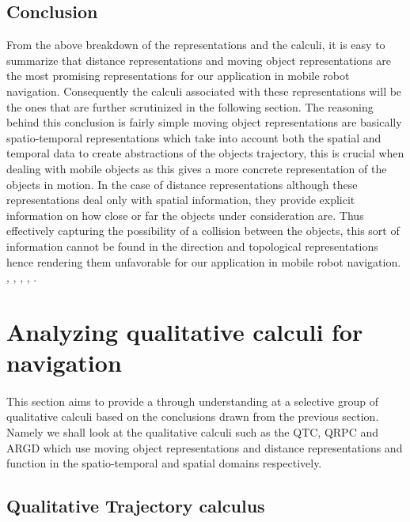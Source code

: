 		\subsection{Conclusion}From the above breakdown of the representations and the calculi, it is easy to summarize that distance representations and moving object representations are the most promising representations for our application in mobile robot navigation. Consequently the calculi associated with these representations will be the ones that are further scrutinized in the following section. The reasoning behind this conclusion is fairly simple moving object representations are basically spatio-temporal representations which take into account both the spatial and temporal data to create abstractions of the objects trajectory, this is crucial when dealing with mobile objects as this gives a more concrete representation of the objects in motion. In the case of distance representations although these representations deal only with spatial information, they provide explicit information on how close or far the objects under consideration are. Thus effectively capturing the possibility of a collision between the objects, this sort of information cannot be found in the direction and topological representations hence rendering them unfavorable for our application in mobile robot navigation. \cite{chen2015survey}, \cite{cohn1997qualitative}, \cite{cohn2001qualitative}, \cite{cohn2008qualitative}, \cite{Yan2012QualitativeRA}.
	
	\section{Analyzing qualitative calculi for navigation}
	\paragraph{} This section aims to provide a through understanding at a selective group of qualitative calculi based on the conclusions drawn from the previous section. Namely we shall look at the qualitative calculi such as the QTC, QRPC and ARGD which use moving object representations and distance representations and function in the spatio-temporal and spatial domains respectively.
	\subsection{Qualitative Trajectory calculus}

